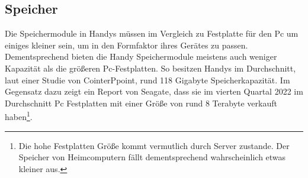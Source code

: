 \subsection{Speicher}\myCheckmark
Die Speichermodule in Handys müssen im Vergleich zu Festplatte für den Pc um einiges kleiner sein, um in den Formfaktor ihres Gerätes zu passen. Dementsprechend bieten die Handy Speichermodule meistens auch weniger Kapazität als die größeren Pc-Festplatten. %
	So besitzen Handys im Durchschnitt, laut einer Studie von CointerPpoint, rund 118 Gigabyte Speicherkapazität\cite{pcVsphone_storageSmartphone}. Im Gegensatz dazu zeigt ein Report von Seagate, dass sie im vierten Quartal 2022 im Durchschnitt Pc Festplatten mit einer Größe von rund 8 Terabyte verkauft haben\cite{pcVsphone_storageSeagate}\footnote{Die hohe Festplatten Größe kommt vermutlich durch Server zustande. Der Speicher von Heimcomputern fällt dementsprechend wahrscheinlich etwas kleiner aus.}. 

